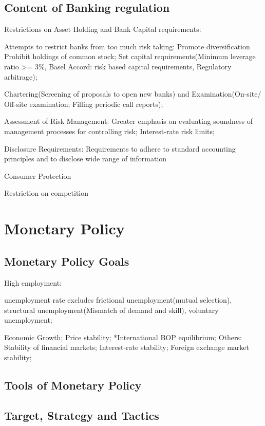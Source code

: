 \documentclass[10pt, a4paper]{article}
\begin{document}
    \subsection{Content of Banking regulation}
        Restrictions on Asset Holding and Bank Capital requirements: 

        \quad Attempts to restrict banks from too much risk taking: Promote diversification Prohibit holdings of common stock; Set capital requirements(Minimum leverage ratio >= 3\%, Basel Accord: risk based capital requirements, Regulatory arbitrage);

        \quad Chartering(Screening of proposals to open new banks) and Examination(On-site/ Off-site examination; Filling periodic call reports);
        
        \quad Assessment of Risk Management: Greater emphasis on evaluating soundness of management processes for controlling risk; Interest-rate risk limits;
        
        \quad Disclosure Requirements: Requirements to adhere to standard accounting principles and to disclose wide range of information 

        \quad Consumer Protection

        \quad Restriction on competition

\section{Monetary Policy}
    \subsection{Monetary Policy Goals}
        High employment: 

            \quad unemployment rate excludes frictional unemployment(mutual selection), structural unemployment(Mismatch of demand and skill), voluntary unemployment; 
        
        Economic Growth; Price stability; *International BOP equilibrium; Others: Stability of financial markets; Interest-rate stability; Foreign exchange market stability;

    \subsection{Tools of Monetary Policy}
    \subsection{Target, Strategy and Tactics}
\end{document}
